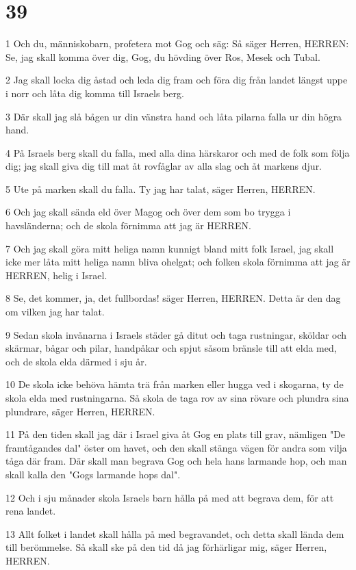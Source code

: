 \chapter{39}

\par 1 Och du, människobarn, profetera mot Gog och säg: Så säger Herren, HERREN: Se, jag skall komma över dig, Gog, du hövding över Ros, Mesek och Tubal.
\par 2 Jag skall locka dig åstad och leda dig fram och föra dig från landet längst uppe i norr och låta dig komma till Israels berg.
\par 3 Där skall jag slå bågen ur din vänstra hand och låta pilarna falla ur din högra hand.
\par 4 På Israels berg skall du falla, med alla dina härskaror och med de folk som följa dig; jag skall giva dig till mat åt rovfåglar av alla slag och åt markens djur.
\par 5 Ute på marken skall du falla. Ty jag har talat, säger Herren, HERREN.
\par 6 Och jag skall sända eld över Magog och över dem som bo trygga i havsländerna; och de skola förnimma att jag är HERREN.
\par 7 Och jag skall göra mitt heliga namn kunnigt bland mitt folk Israel, jag skall icke mer låta mitt heliga namn bliva ohelgat; och folken skola förnimma att jag är HERREN, helig i Israel.
\par 8 Se, det kommer, ja, det fullbordas! säger Herren, HERREN. Detta är den dag om vilken jag har talat.
\par 9 Sedan skola invånarna i Israels städer gå ditut och taga rustningar, sköldar och skärmar, bågar och pilar, handpåkar och spjut såsom bränsle till att elda med, och de skola elda därmed i sju år.
\par 10 De skola icke behöva hämta trä från marken eller hugga ved i skogarna, ty de skola elda med rustningarna. Så skola de taga rov av sina rövare och plundra sina plundrare, säger Herren, HERREN.
\par 11 På den tiden skall jag där i Israel giva åt Gog en plats till grav, nämligen "De framtågandes dal" öster om havet, och den skall stänga vägen för andra som vilja tåga där fram. Där skall man begrava Gog och hela hans larmande hop, och man skall kalla den "Gogs larmande hops dal".
\par 12 Och i sju månader skola Israels barn hålla på med att begrava dem, för att rena landet.
\par 13 Allt folket i landet skall hålla på med begravandet, och detta skall lända dem till berömmelse. Så skall ske på den tid då jag förhärligar mig, säger Herren, HERREN.

